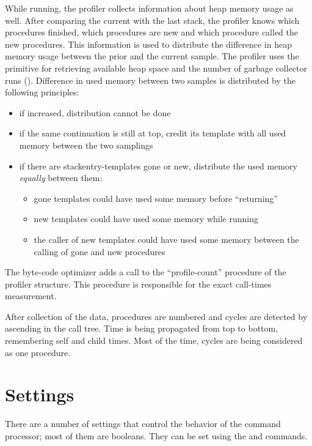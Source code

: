 While running, the profiler collects information about heap memory usage as well.
After comparing the current with the last stack, the profiler knows which procedures finished, which procedures are new
and which procedure called the new procedures. This information is used to distribute the difference in
heap memory usage between the prior and the current sample.
The profiler uses the  primitive for retrieving available heap space and the number of
garbage collector runs ().
Difference in used memory between two samples is distributed by the following principles:
\begin{itemize}
	\item if  increased, distribution cannot be done
	\item if the same continuation is still at top, credit its template with all used memory between the two samplings
	\item if there are stackentry-templates gone or new, distribute the used memory {\it equally} between them:
		\begin{itemize}
			\item gone templates could have used some memory before ``returning''
			\item new  templates could have used some memory while running
			\item the caller of new templates could have used some memory between the calling of gone and new procedures
		\end{itemize}
\end{itemize}

The byte-code optimizer  adds a call to the ``profile-count'' procedure of the
profiler structure. This procedure is responsible for the exact call-times measurement.

After collection of the data, procedures are numbered and cycles are detected by ascending in the
call tree. Time is being propagated from top to bottom, remembering self and child times. Most
of the time, cycles are being considered as one procedure.


\section{Settings}
\label{settings}

There are a number of settings that control the behavior of the
 command processor; most of them are booleans.
They can be set using the  and  commands.

